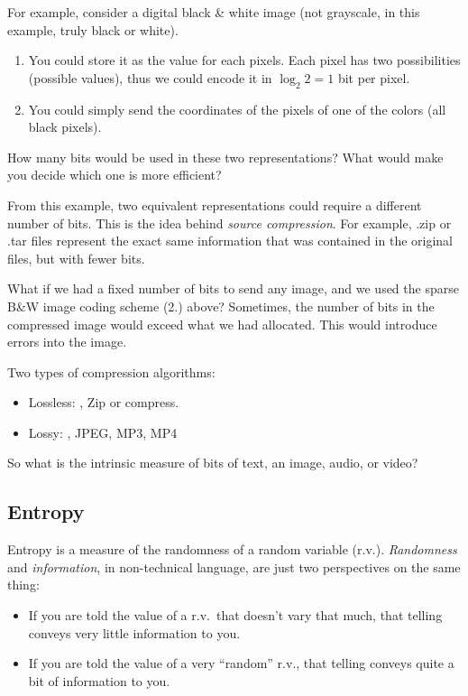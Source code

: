 For example, consider a digital black \& white image (not grayscale, in this example, truly black or white).
\begin{enumerate}
  \item You could store it as the value for each pixels.  Each pixel has two
  possibilities (possible values),
  thus we could encode it in $\log_2 2 = 1$ bit per pixel.
  \item You could simply send the coordinates of the pixels of one
  of the colors (\eg all black pixels).
\end{enumerate}
How many bits would be used in these two representations? What would
make you decide which one is more efficient?

\vspace{0.05in} \noindent  From this example, two equivalent representations could require a different number of bits.  This is the idea behind \emph{source compression}. For example, .zip or .tar files represent the exact same information that was contained in the original files, but with fewer bits.

\vspace{0.05in} \noindent  What if we had a fixed number of bits to
send any image, and we used the sparse B\&W image coding scheme (2.)
above?  Sometimes, the number of bits in the compressed image would
exceed what we had allocated.  This would introduce errors into the
image.

Two types of compression algorithms:
\begin{itemize}
  \item Lossless: \eg, Zip or compress.
  \item Lossy:  \eg, JPEG, MP3, MP4
\end{itemize}


So what is the intrinsic measure of bits of text, an image, audio, or video?

\subsection{Entropy}

Entropy is a measure of the randomness of a random variable (r.v.).
\emph{Randomness} and \emph{information}, in non-technical language,
are just two perspectives on the same thing:
\begin{itemize}
  \item If you are told the value of a r.v.\ that doesn't vary that
    much, that telling conveys very little information to you.
  \item If you are told the value of a very ``random'' r.v., that
    telling conveys quite a bit of information to you.
\end{itemize}

